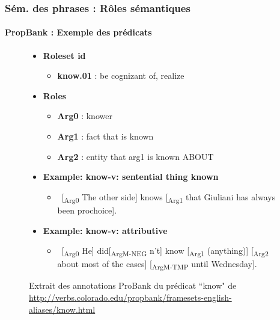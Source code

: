 \documentclass[xcolor=table]{beamer}
\begin{document}
\begin{frame}
\frametitle{Sém. des phrases : Rôles sémantiques}
\framesubtitle{PropBank : Exemple des prédicats}
	
\vspace{-6pt}
\begin{figure}
	\scriptsize
	\begin{itemize}
		\item \textbf{Roleset id}
		\begin{itemize}\scriptsize
			\item \textbf{know.01} : be cognizant of, realize
		\end{itemize}
		\item \textbf{Roles}
		\begin{itemize}\scriptsize
			\item \textbf{Arg0} : knower
			\item \textbf{Arg1} : fact that is known
			\item \textbf{Arg2} : entity that arg1 is known ABOUT
		\end{itemize}
	
		\item \textbf{Example: know-v: sentential thing known}
		\begin{itemize}\scriptsize
			\item \ [\textsubscript{\color{red}Arg0} The other side] knows [\textsubscript{\color{red}Arg1} that Giuliani has always been prochoice].
		\end{itemize}
	
		\item \textbf{Example: know-v: attributive}
		\begin{itemize}\scriptsize
			\item \ [\textsubscript{\color{red}Arg0} He] did[\textsubscript{\color{red}ArgM-NEG} n't] know [\textsubscript{\color{red}Arg1} (anything)] [\textsubscript{\color{red}Arg2} about most of the cases] [\textsubscript{\color{red}ArgM-TMP} until Wednesday].
		\end{itemize}
	\end{itemize}
		
	\caption{Extrait des annotations ProBank du prédicat ``know" de \url{http://verbs.colorado.edu/propbank/framesets-english-aliases/know.html}}
\end{figure}
	
\end{frame}

%
%	
%	
\end{document}
